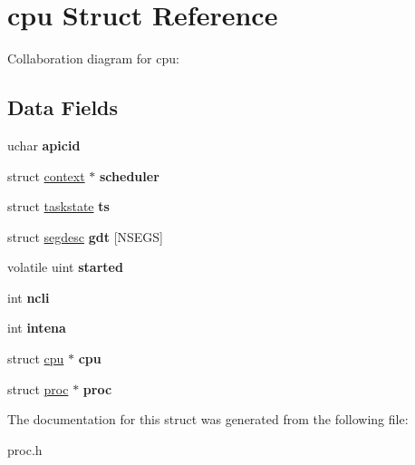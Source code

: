 \hypertarget{structcpu}{}\section{cpu Struct Reference}
\label{structcpu}


Collaboration diagram for cpu\+:
\subsection*{Data Fields}
\begin{DoxyCompactItemize}
\item 
uchar {\bfseries apicid}\hypertarget{structcpu_ad08a3478ec15fc8bec1d9b6b5a0431db}{}\label{structcpu_ad08a3478ec15fc8bec1d9b6b5a0431db}

\item 
struct \hyperlink{structcontext}{context} $\ast$ {\bfseries scheduler}\hypertarget{structcpu_aaa1510fdf8a2230c033d04e13e4fdd9e}{}\label{structcpu_aaa1510fdf8a2230c033d04e13e4fdd9e}

\item 
struct \hyperlink{structtaskstate}{taskstate} {\bfseries ts}\hypertarget{structcpu_a32e7b5aa877171c943d47038e818a159}{}\label{structcpu_a32e7b5aa877171c943d47038e818a159}

\item 
struct \hyperlink{structsegdesc}{segdesc} {\bfseries gdt} \mbox{[}N\+S\+E\+GS\mbox{]}\hypertarget{structcpu_aee38fb8832f8e728538b2cee877d1c09}{}\label{structcpu_aee38fb8832f8e728538b2cee877d1c09}

\item 
volatile uint {\bfseries started}\hypertarget{structcpu_a869f6e0e1dbf69de0bdb3546f981847f}{}\label{structcpu_a869f6e0e1dbf69de0bdb3546f981847f}

\item 
int {\bfseries ncli}\hypertarget{structcpu_a9ccad8ae031c295f86e96de26df24805}{}\label{structcpu_a9ccad8ae031c295f86e96de26df24805}

\item 
int {\bfseries intena}\hypertarget{structcpu_a26fc271fea8af30d67fc2ae22ef0a82f}{}\label{structcpu_a26fc271fea8af30d67fc2ae22ef0a82f}

\item 
struct \hyperlink{structcpu}{cpu} $\ast$ {\bfseries cpu}\hypertarget{structcpu_a96823491c316b96bdd2fb80fa8e270f9}{}\label{structcpu_a96823491c316b96bdd2fb80fa8e270f9}

\item 
struct \hyperlink{structproc}{proc} $\ast$ {\bfseries proc}\hypertarget{structcpu_a9e71a6265904fd644875a9ea5a413c89}{}\label{structcpu_a9e71a6265904fd644875a9ea5a413c89}

\end{DoxyCompactItemize}


The documentation for this struct was generated from the following file\+:\begin{DoxyCompactItemize}
\item 
proc.\+h\end{DoxyCompactItemize}
